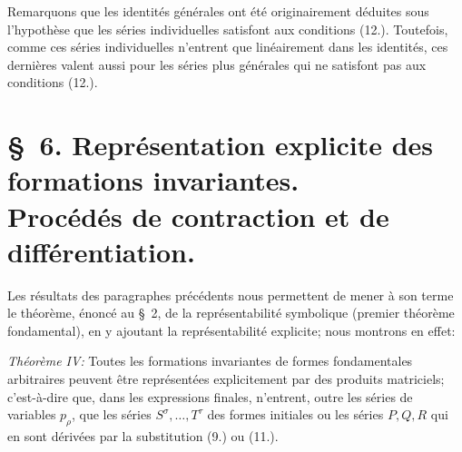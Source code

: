 \documentclass[11pt]{article}
\begin{document}
Remarquons que les identités générales ont été originairement déduites sous l'hypothèse que les séries individuelles satisfont aux conditions (12.). Toutefois, comme ces séries individuelles n'entrent que linéairement dans les identités, ces dernières valent aussi pour les séries plus générales qui ne satisfont pas aux conditions (12.).

\section*{\S\ 6. Représentation explicite des formations invariantes.\\Procédés de contraction et de différentiation.}
Les résultats des paragraphes précédents nous permettent de mener à son terme le théorème, énoncé au \S\ 2, de la représentabilité symbolique (premier théorème fondamental), en y ajoutant la représentabilité explicite; nous montrons en effet:

\emph{Théorème IV:} \og{} Toutes les formations invariantes de formes fondamentales arbitraires peuvent être représentées explicitement par des produits matriciels; c'est-à-dire que, dans les expressions finales, n'entrent, outre les séries de variables $p_\rho$, que les séries $S^\sigma,\ldots,T^\tau$ des formes initiales ou les séries $P,Q,R$ qui en sont dérivées par la substitution (9.) ou (11.). \fg{}
\end{document}
